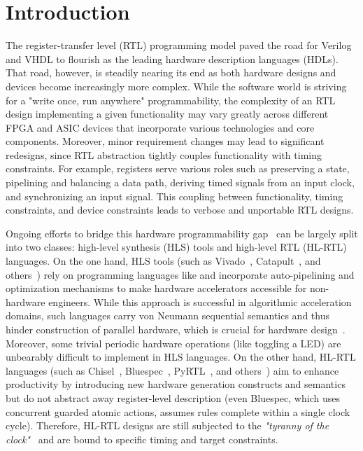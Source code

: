 \section{Introduction}
The register-transfer level (RTL) programming model paved the road for Verilog and VHDL to flourish as the leading hardware description languages (HDLs). That road, however, is steadily nearing its end as both hardware designs and devices become increasingly more complex. While the software world is striving for a "write once, run anywhere" programmability, the complexity of an RTL design implementing a given functionality may vary greatly across different FPGA and ASIC devices that incorporate various technologies and core components. Moreover, minor requirement changes may lead to significant redesigns, since RTL abstraction tightly couples functionality with timing constraints. For example, registers serve various roles such as preserving a state, pipelining and balancing a data path, deriving timed signals from an input clock, and synchronizing an input signal. This coupling between functionality, timing constraints, and device constraints leads to verbose and unportable RTL designs. 

Ongoing efforts to bridge this hardware programmability gap~\cite{Kapre2016, Nane2016, Windh2015} can be largely split into two classes: high-level synthesis (HLS) tools and high-level RTL (HL-RTL) languages.
On the one hand, HLS tools (such as Vivado~\cite{Vivado2012}, Catapult~\cite{graphics2008catapult}, and others~\cite{Kavvadias2013, synphony2015}) rely on programming languages like and incorporate auto-pipelining and optimization mechanisms to make hardware accelerators accessible for non-hardware engineers. While this approach is successful in algorithmic acceleration domains, such languages carry von Neumann sequential semantics and thus hinder construction of parallel hardware, which is crucial for hardware design~\cite{Zhao2017}. Moreover, some trivial periodic hardware operations (like toggling a LED) are unbearably difficult to implement in HLS languages.
On the other hand, HL-RTL languages (such as Chisel~\cite{Bachrach2012}, Bluespec~\cite{nikhil2004bluespec}, PyRTL~\cite{Clow2017}, and others~\cite{Charles2016, Liu2017, jiang2018mamba, decaluwe2004myhdl, CxLang2014, Lockhart2014}) aim to enhance productivity by introducing new hardware generation constructs and semantics but do not abstract away register-level description (even Bluespec, which uses concurrent guarded atomic actions, assumes rules complete within a single clock cycle). Therefore, HL-RTL designs are still subjected to the \emph{"tyranny of the clock"}~\cite{Sutherland2012} and are bound to specific timing and target constraints.

